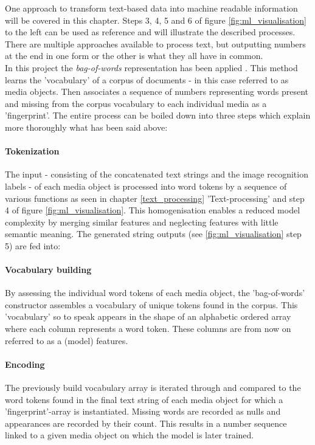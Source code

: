 One approach to transform text-based data into machine readable information will be covered in this chapter. Steps 3, 4, 5 and 6 of figure \ref{fig:ml_visualisation} to the left can be used as reference and will illustrate the described processes.\\
There are multiple approaches available to process text, but outputting numbers at the end in one form or the other is what they all have in common.\\
In this project the \textit{bag-of-words} representation has been applied \parencite{Joulin2016}. This method learns the 'vocabulary' of a corpus of documents - in this case referred to as media objects. Then associates a sequence of numbers representing words present and missing from the corpus vocabulary to each individual media as a 'fingerprint'. The entire process can be boiled down into three steps which explain more thoroughly what has been said above:

\paragraph{Tokenization} The input - consisting of the concatenated text strings and the image recognition labels - of each media object is processed into word tokens by a sequence of various functions as seen in chapter \ref{text_processing} 'Text-processing' and step 4 of figure \ref{fig:ml_visualisation}. This homogenisation enables a reduced model complexity by merging similar features and neglecting features with little semantic meaning. The generated string outputs (see \ref{fig:ml_visualisation} step 5) are fed into:

\paragraph{Vocabulary building} By assessing the individual word tokens of each media object, the 'bag-of-words' constructor assembles a vocabulary of unique tokens found in the corpus. This 'vocabulary' so to speak appears in the shape of an alphabetic ordered array where each column represents a word token. These columns are from now on referred to as a (model) features.

\paragraph{Encoding} The previously build vocabulary array is iterated through and compared to the word tokens found in the final text string of each media object for which a 'fingerprint'-array is instantiated. Missing words are recorded as nulls and appearances are recorded by their count. This results in a number sequence linked to a given media object on which the model is later trained.

